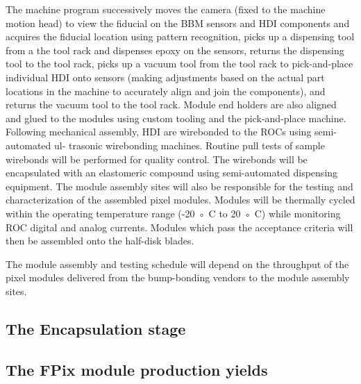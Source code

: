 The machine program successively moves the camera (fixed to the machine motion head) to view the fiducial on the BBM sensors and HDI components and acquires the fiducial location using pattern recognition,
picks up a dispensing tool from a the tool rack and dispenses epoxy on the sensors, returns the dispensing tool to the tool rack, picks up a vacuum tool from the tool rack to pick-and-place individual HDI onto sensors (making adjustments based on the actual part locations in the machine to accurately align and join the components), and returns the vacuum tool to the tool rack. Module end holders are also aligned and glued to the modules using custom tooling and the pick-and-place machine. Following mechanical assembly, HDI are wirebonded to the ROCs using semi-automated ul-
trasonic wirebonding machines. Routine pull tests of sample wirebonds will be performed
for quality control. The wirebonds will be encapsulated with an elastomeric compound using
semi-automated dispensing equipment. The module assembly sites will also be responsible for
the testing and characterization of the assembled pixel modules. Modules will be thermally
cycled within the operating temperature range (-20 ◦ C to 20 ◦ C) while monitoring ROC digital
and analog currents. Modules which pass the acceptance criteria will then be assembled onto
the half-disk blades.

The module assembly and testing schedule will depend on the throughput of the pixel modules delivered from the bump-bonding vendors to the module
assembly sites.



\subsection{The Encapsulation stage}


\subsection{The FPix module production yields}

